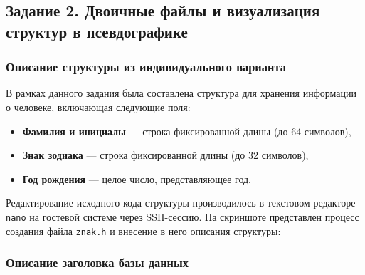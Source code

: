 \subsection{Задание 2. Двоичные файлы и визуализация структур в псевдографике}

\subsubsection{Описание структуры из индивидуального варианта}

В рамках данного задания была составлена структура для хранения информации о человеке, включающая следующие поля:
\begin{itemize}
  \item \textbf{Фамилия и инициалы} --- строка фиксированной длины (до 64 символов),
  \item \textbf{Знак зодиака} --- строка фиксированной длины (до 32 символов),
  \item \textbf{Год рождения} --- целое число, представляющее год.
\end{itemize}

Редактирование исходного кода структуры производилось в текстовом редакторе \texttt{nano} на гостевой системе через SSH-сессию. На скриншоте представлен процесс создания файла \texttt{znak.h} и внесение в него описания структуры:


\subsubsection{Описание заголовка базы данных}

